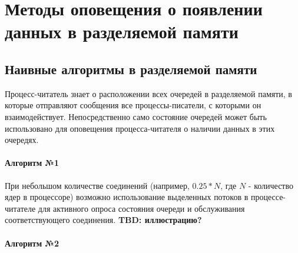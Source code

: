 %
%
%
%
%

\section{Методы оповещения о появлении данных в разделяемой памяти}

\subsection{Наивные алгоритмы в разделяемой памяти}

Процесс-читатель знает о расположении всех очередей в разделяемой памяти, в которые отправляют сообщения все процессы-писатели, с которыми он взаимодействует. Непосредственно само состояние очередей может быть использовано для оповещения процесса-читателя о наличии данных в этих очередях.

\paragraph{Алгоритм №1}

При небольшом количестве соединений (например, $0.25 * N$, где $N$ - количество ядер в процессоре) возможно использование выделенных потоков в процессе-читателе для активного опроса состояния очереди и обслуживания соответствующего соединения.  \textbf{TBD: иллюстрацию?}

\paragraph{Алгоритм №2}

